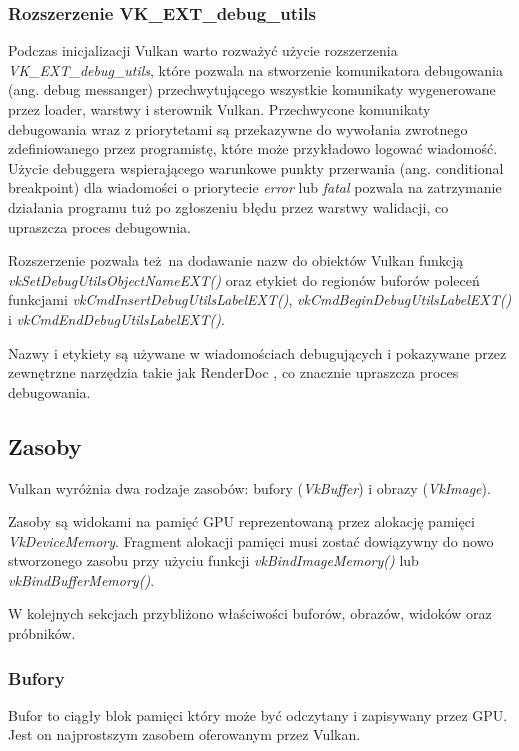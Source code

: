 \subsubsection{Rozszerzenie VK\_EXT\_debug\_utils}

Podczas inicjalizacji Vulkan warto rozważyć użycie rozszerzenia \textit{VK\_EXT\_debug\_utils}, które pozwala na stworzenie komunikatora debugowania (ang. debug messanger) przechwytującego wszystkie komunikaty wygenerowane przez loader, warstwy i sterownik Vulkan.
Przechwycone komunikaty debugowania wraz z priorytetami są przekazywne do wywołania zwrotnego zdefiniowanego przez programistę, które może przykładowo logować wiadomość.
Użycie debuggera wspierającego warunkowe punkty przerwania (ang. conditional breakpoint) dla wiadomości o priorytecie \textit{error} lub \textit{fatal} pozwala na zatrzymanie działania programu tuż po zgłoszeniu błędu przez warstwy walidacji, co upraszcza proces debugownia.

Rozszerzenie pozwala też na dodawanie nazw do obiektów Vulkan funkcją \textit{vkSetDebugUtilsObjectNameEXT()} oraz etykiet do regionów buforów poleceń funkcjami \textit{vkCmdInsertDebugUtilsLabelEXT()}, \textit{vkCmdBeginDebugUtilsLabelEXT()} i \textit{vkCmdEndDebugUtilsLabelEXT()}.

Nazwy i etykiety są używane w wiadomościach debugujących i pokazywane przez zewnętrzne narzędzia takie jak RenderDoc \cite{RENDERDOC}, co znacznie upraszcza proces debugowania.


\subsection{Zasoby}

Vulkan wyróżnia dwa rodzaje zasobów: bufory (\textit{VkBuffer}) i obrazy (\textit{VkImage}).

Zasoby są widokami na pamięć GPU reprezentowaną przez alokację pamięci \textit{VkDeviceMemory}.
Fragment alokacji pamięci musi zostać dowiązywny do nowo stworzonego zasobu przy użyciu funkcji \textit{vkBindImageMemory()} lub \textit{vkBindBufferMemory()}.

W kolejnych sekcjach przybliżono właściwości buforów, obrazów, widoków oraz próbników. 

\subsubsection{Bufory}

Bufor to ciągły blok pamięci który może być odczytany i zapisywany przez GPU. Jest on najprostszym zasobem oferowanym przez Vulkan.

